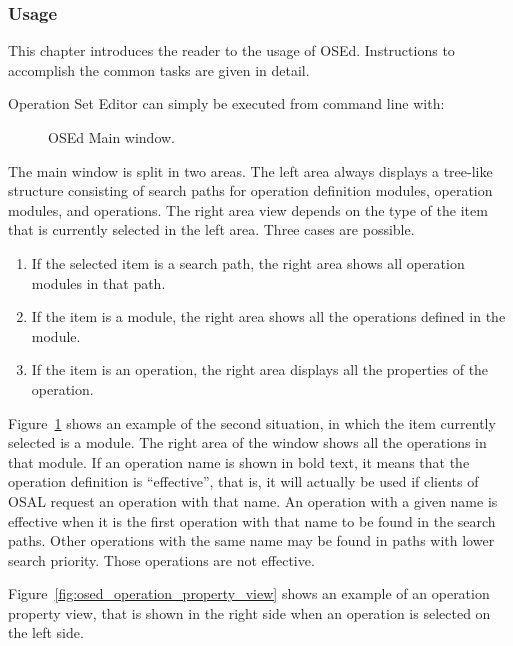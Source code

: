 \documentclass[twoside]{tceusermanual}
\begin{document}
\subsubsection{Usage}

This chapter introduces the reader to the usage of OSEd. Instructions to
accomplish the common tasks are given in detail.

Operation Set Editor can simply be executed from command line with:


\begin{figure}[tb]
\centerline{}
\caption{OSEd Main window.}
\label{fig:osed_main_window}
\end{figure}

The main window is split in two areas. The left area always displays a
tree-like structure consisting of search paths for operation definition
modules, operation modules, and operations.  The right area view depends on the
type of the item that is currently selected in the left area. Three cases are
possible.
%
\begin{enumerate}
\item %
  If the selected item is a search path, the right area shows all operation
modules in that path.
\item %
  If the item is a module, the right area shows all the operations defined
  in the module.
\item %
  If the item is an operation, the right area displays all the properties of
  the operation.
\end{enumerate}

Figure~\ref{fig:osed_main_window} shows an example of the second situation, in
which the item currently selected is a module. The right area of the window
shows all the operations in that module. If an operation name is shown in
bold text, it means that the operation definition is ``effective'', that is,
it will actually be used if clients of OSAL request an operation with that
name. An operation with a given name is effective when it is the first
operation with that name to be found in the search paths. Other operations
with the same name may be found in paths with lower search priority. Those
operations are not effective.

Figure~\ref{fig:osed_operation_property_view} shows an example of an operation 
property view, that is shown in the right side when an operation is selected 
on the left side.
\end{document}
